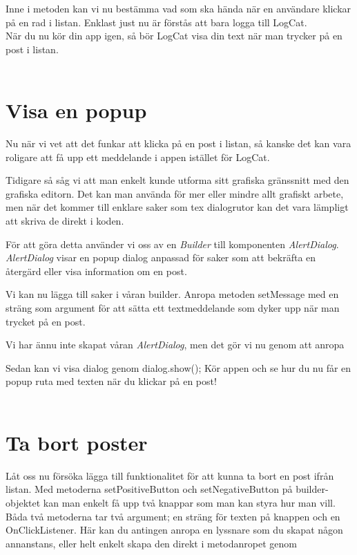 \documentclass[11 pt]{article} %
\begin{document}
Inne i metoden kan vi nu bestämma vad som ska hända när en användare klickar på en rad i listan. Enklast just nu är förstås att bara logga till LogCat.\\

När du nu kör din app igen, så bör LogCat visa din text när man trycker på en post i listan.\\ \\
\section{Visa en popup}
Nu när vi vet att det funkar att klicka på en post i listan, så kanske det kan vara roligare att få upp ett meddelande i appen istället för LogCat.

Tidigare så såg vi att man enkelt kunde utforma sitt grafiska gränssnitt med den grafiska editorn. Det kan man använda för mer eller mindre allt grafiskt arbete, men när det kommer till enklare saker som tex dialogrutor kan det vara lämpligt att skriva de direkt i koden.

För att göra detta använder vi oss av en \textit{Builder} till komponenten \textit{AlertDialog}. \textit{AlertDialog} visar en popup dialog anpassad för saker som att bekräfta en återgärd eller visa information om en post.


Vi kan nu lägga till saker i våran builder. Anropa metoden setMessage med en sträng som argument för att sätta ett textmeddelande som dyker upp när man trycket på en post.

Vi har ännu inte skapat våran \textit{AlertDialog}, men det gör vi nu genom att anropa 

Sedan kan vi visa dialog genom dialog.show();
Kör appen och se hur du nu får en popup ruta med texten när du klickar på en post!\\ \\

\section{Ta bort poster}
Låt oss nu försöka lägga till funktionalitet för att kunna ta bort en post ifrån listan. 
Med metoderna setPositiveButton och setNegativeButton på builder-objektet kan man enkelt få upp två knappar som man kan styra hur man vill. Båda två metoderna tar två argument; en sträng för texten på knappen och en OnClickListener.
Här kan du antingen anropa en lyssnare som du skapat någon annanstans, eller helt enkelt skapa den direkt i metodanropet genom 

\end{document}
